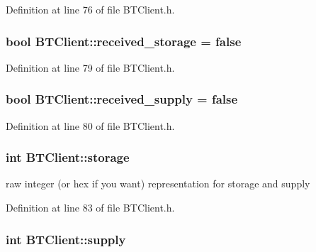 Definition at line 76 of file B\-T\-Client.\-h.

\hypertarget{classBTClient_a41a7d3382ab8bbdf4b7d78b7b69ff85f}{
\subsubsection[{received\-\_\-storage}]{\setlength{\rightskip}{0pt plus 5cm}bool B\-T\-Client\-::received\-\_\-storage = false\hspace{0.3cm}{\ttfamily [private]}}}\label{classBTClient_a41a7d3382ab8bbdf4b7d78b7b69ff85f}


Definition at line 79 of file B\-T\-Client.\-h.

\hypertarget{classBTClient_af00b18b695ecc4bdeea133572eb0fd6d}{
\subsubsection[{received\-\_\-supply}]{\setlength{\rightskip}{0pt plus 5cm}bool B\-T\-Client\-::received\-\_\-supply = false\hspace{0.3cm}{\ttfamily [private]}}}\label{classBTClient_af00b18b695ecc4bdeea133572eb0fd6d}


Definition at line 80 of file B\-T\-Client.\-h.

\hypertarget{classBTClient_a5ba419e7e6be73f5ec26f6b6c8d4ccf1}{
\subsubsection[{storage}]{\setlength{\rightskip}{0pt plus 5cm}int B\-T\-Client\-::storage\hspace{0.3cm}{\ttfamily [private]}}}\label{classBTClient_a5ba419e7e6be73f5ec26f6b6c8d4ccf1}


raw integer (or hex if you want) representation for storage and supply 



Definition at line 83 of file B\-T\-Client.\-h.

\hypertarget{classBTClient_a3974a28859432eeef27cfd7391ed7d60}{
\subsubsection[{supply}]{\setlength{\rightskip}{0pt plus 5cm}int B\-T\-Client\-::supply\hspace{0.3cm}{\ttfamily [private]}}}\label{classBTClient_a3974a28859432eeef27cfd7391ed7d60}


